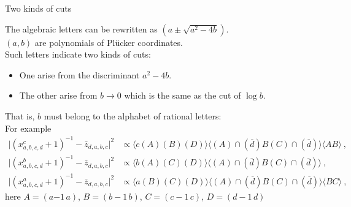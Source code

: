 \documentclass[10pt]{beamer}
\begin{document}
\begin{frame}{Two kinds of cuts}
  
  The algebraic letters can be rewritten as $(a\pm \sqrt{a^{2}-4b})$.\\
  $(a,b)$ are polynomials of Pl\"{u}cker coordinates. \\
  Such letters indicate two kinds of cuts:
  \begin{itemize}
    \item One arise from the discriminant $a^{2}-4b$.
    \item The other arise from $b\to0$ which is the same as the cut of $\log b$. 
  \end{itemize}
That is, $b$ must belong to the alphabet of \alert{rational letters}:\\
For example {\footnotesize{
\begin{equation*}
  \begin{aligned}
  \bigl|(x^{c}_{a,b,c,d}+1)^{-1}-\bar{z}_{d,a,b,c}\bigr|^{2}&\propto\langle c(A)(B)(D)\rangle\langle(A) \cap(\overline{d}) B(C) \cap(\overline{d})\rangle\langle A B\rangle \:,\\
  \bigl|(x^{b}_{a,b,c,d}+1)^{-1}-\bar{z}_{d,a,b,c}\bigr|^{2}&\propto \langle b(A)(C)(D)\rangle\langle(A) \cap(\overline{d}) B(C) \cap(\overline{d})\rangle \:, \\
  \bigl|(x^{a}_{a,b,c,d}+1)^{-1}-\bar{z}_{d,a,b,c}\bigr|^{2}&\propto \langle a(B)(C)(D)\rangle\langle(A) \cap(\overline{d}) B(C) \cap(\overline{d})\rangle\langle B C\rangle \:,
  \end{aligned} 
\end{equation*}
}}
here $A=(a{-1}\,a)$, $B=(b{-}1\,b)$, $C=(c{-}1\,c)$, $D=(d{-}1\,d)$
\end{frame}
\end{document}
